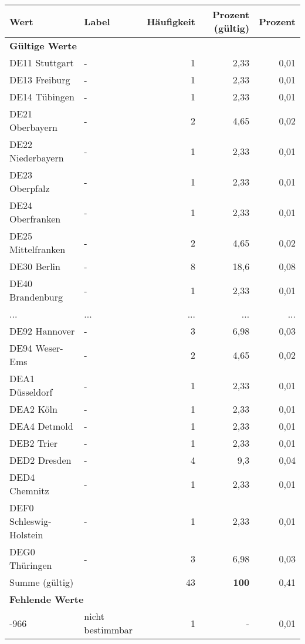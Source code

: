      \begin{longtable}{Xlrrr}
     \toprule
     \textbf{Wert} & \textbf{Label} & \textbf{Häufigkeit} & \textbf{Prozent (gültig)} & \textbf{Prozent} \\
     \endhead
     \midrule
     \multicolumn{5}{l}{\textbf{Gültige Werte}}\\
        \multicolumn{1}{X}{DE11 Stuttgart} & - & 1 & 2,33 & 0,01 \\
        \multicolumn{1}{X}{DE13 Freiburg} & - & 1 & 2,33 & 0,01 \\
        \multicolumn{1}{X}{DE14 Tübingen} & - & 1 & 2,33 & 0,01 \\
        \multicolumn{1}{X}{DE21 Oberbayern} & - & 2 & 4,65 & 0,02 \\
        \multicolumn{1}{X}{DE22 Niederbayern} & - & 1 & 2,33 & 0,01 \\
        \multicolumn{1}{X}{DE23 Oberpfalz} & - & 1 & 2,33 & 0,01 \\
        \multicolumn{1}{X}{DE24 Oberfranken} & - & 1 & 2,33 & 0,01 \\
        \multicolumn{1}{X}{DE25 Mittelfranken} & - & 2 & 4,65 & 0,02 \\
        \multicolumn{1}{X}{DE30 Berlin} & - & 8 & 18,6 & 0,08 \\
        \multicolumn{1}{X}{DE40 Brandenburg} & - & 1 & 2,33 & 0,01 \\
       ... & ... & ... & ... & ... \\
        \multicolumn{1}{X}{DE92 Hannover} & - & 3 & 6,98 & 0,03 \\
        \multicolumn{1}{X}{DE94 Weser-Ems} & - & 2 & 4,65 & 0,02 \\
        \multicolumn{1}{X}{DEA1 Düsseldorf} & - & 1 & 2,33 & 0,01 \\
        \multicolumn{1}{X}{DEA2 Köln} & - & 1 & 2,33 & 0,01 \\
        \multicolumn{1}{X}{DEA4 Detmold} & - & 1 & 2,33 & 0,01 \\
        \multicolumn{1}{X}{DEB2 Trier} & - & 1 & 2,33 & 0,01 \\
        \multicolumn{1}{X}{DED2 Dresden} & - & 4 & 9,3 & 0,04 \\
        \multicolumn{1}{X}{DED4 Chemnitz} & - & 1 & 2,33 & 0,01 \\
        \multicolumn{1}{X}{DEF0 Schleswig-Holstein} & - & 1 & 2,33 & 0,01 \\
        \multicolumn{1}{X}{DEG0 Thüringen} & - & 3 & 6,98 & 0,03 \\
     \midrule
      \multicolumn{2}{l}{Summe (gültig)} & 43 &
      \textbf{100} &
         0,41 \\
     \multicolumn{5}{l}{\textbf{Fehlende Werte}}\\
       -966 & nicht bestimmbar & 1 & - & 0,01 \\


\end{longtable}
